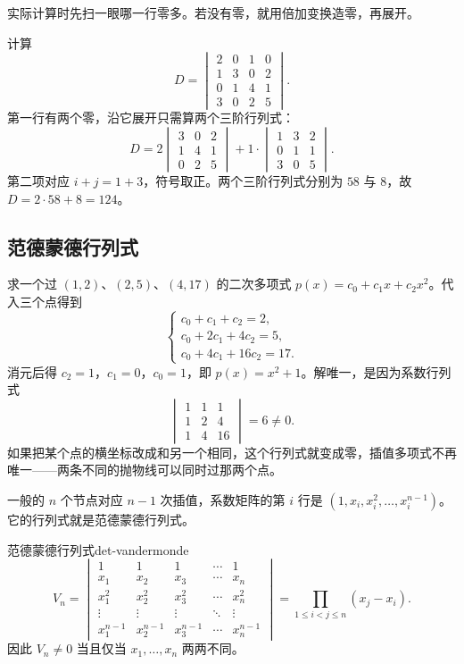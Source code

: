 实际计算时先扫一眼哪一行零多。若没有零，就用倍加变换造零，再展开。

计算
\[
D=\begin{vmatrix}
2&0&1&0\\
1&3&0&2\\
0&1&4&1\\
3&0&2&5
\end{vmatrix}.
\]
第一行有两个零，沿它展开只需算两个三阶行列式：
\[
D=2\begin{vmatrix}3&0&2\\1&4&1\\0&2&5\end{vmatrix}
+1\cdot\begin{vmatrix}1&3&2\\0&1&1\\3&0&5\end{vmatrix}.
\]
第二项对应 $i+j=1+3$，符号取正。两个三阶行列式分别为 $58$ 与 $8$，故 $D=2\cdot58+8=124$。

\subsection{范德蒙德行列式}

求一个过 $(1,2)$、$(2,5)$、$(4,17)$ 的二次多项式 $p(x)=c_0+c_1x+c_2x^2$。代入三个点得到
\[
\begin{cases}
c_0+c_1+c_2=2,\\
c_0+2c_1+4c_2=5,\\
c_0+4c_1+16c_2=17.
\end{cases}
\]
消元后得 $c_2=1$，$c_1=0$，$c_0=1$，即 $p(x)=x^2+1$。解唯一，是因为系数行列式
\[
\begin{vmatrix}1&1&1\\1&2&4\\1&4&16\end{vmatrix}=6\neq0.
\]
如果把某个点的横坐标改成和另一个相同，这个行列式就变成零，插值多项式不再唯一——两条不同的抛物线可以同时过那两个点。

一般的 $n$ 个节点对应 $n-1$ 次插值，系数矩阵的第 $i$ 行是 $(1,x_i,x_i^2,\ldots,x_i^{n-1})$。它的行列式就是范德蒙德行列式。

\begin{conclusion}{范德蒙德行列式}{det-vandermonde}
\[
V_n=\begin{vmatrix}
1&1&1&\cdots&1\\
x_1&x_2&x_3&\cdots&x_n\\
x_1^2&x_2^2&x_3^2&\cdots&x_n^2\\
\vdots&\vdots&\vdots&\ddots&\vdots\\
x_1^{n-1}&x_2^{n-1}&x_3^{n-1}&\cdots&x_n^{n-1}
\end{vmatrix}
=\prod_{1\leq i<j\leq n}(x_j-x_i).
\]
因此 $V_n\neq0$ 当且仅当 $x_1,\ldots,x_n$ 两两不同。
\end{conclusion}

